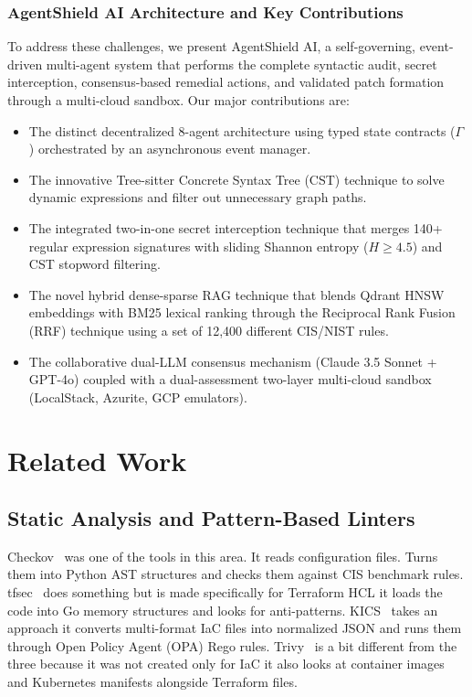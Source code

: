 \documentclass[runningheads]{llncs}
\begin{document}
\subsubsection{AgentShield AI Architecture and Key Contributions}
To address these challenges, we present AgentShield AI, a self-governing, event-driven multi-agent system that performs the complete syntactic audit, secret interception, consensus-based remedial actions, and validated patch formation through a multi-cloud sandbox. Our major contributions are:
\begin{itemize}
    \item The distinct decentralized 8-agent architecture using typed state contracts ($\Gamma$) orchestrated by an asynchronous event manager.
    \item The innovative Tree-sitter Concrete Syntax Tree (CST) technique to solve dynamic expressions and filter out unnecessary graph paths.
    \item The integrated two-in-one secret interception technique that merges 140+ regular expression signatures with sliding Shannon entropy ($H \ge 4.5$) and CST stopword filtering.
    \item The novel hybrid dense-sparse RAG technique that blends Qdrant HNSW embeddings with BM25 lexical ranking through the Reciprocal Rank Fusion (RRF) technique using a set of 12,400 different CIS/NIST rules.
    \item The collaborative dual-LLM consensus mechanism (Claude 3.5 Sonnet + GPT-4o) coupled with a dual-assessment two-layer multi-cloud sandbox (LocalStack, Azurite, GCP emulators).
\end{itemize}


\section{Related Work}

\subsection{Static Analysis and Pattern-Based Linters}
Checkov~\cite{checkov2024} was one of the tools in this area. It reads configuration files. Turns them into Python AST structures and checks them against CIS benchmark rules. tfsec~\cite{tfsec2023} does something but is made specifically for Terraform HCL it loads the code into Go memory structures and looks for anti-patterns. KICS~\cite{kics2022} takes an approach it converts multi-format IaC files into normalized JSON and runs them through Open Policy Agent (OPA) Rego rules. Trivy~\cite{trivy2024} is a bit different from the three because it was not created only for IaC it also looks at container images and Kubernetes manifests alongside Terraform files.
\end{document}

